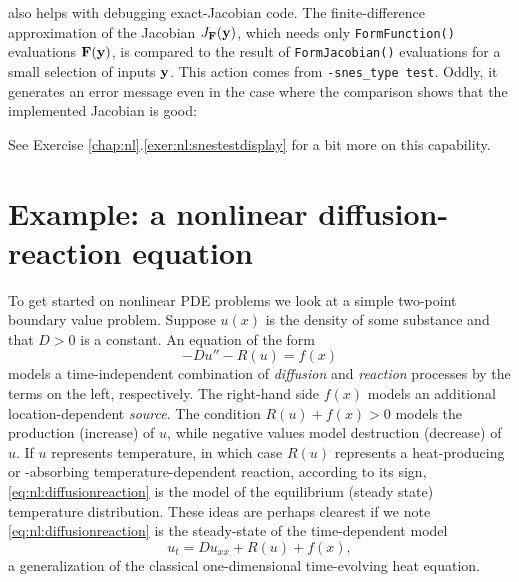 \PETSc also helps with debugging exact-Jacobian code.  The finite-difference approximation of the Jacobian $J_{\mathbf{F}}(\mathbf{y})$, which needs only \texttt{FormFunction()} evaluations $\mathbf{F}(\mathbf{y})$, is compared to the result of \texttt{FormJacobian()} evaluations for a small selection of inputs $\mathbf{y}$.  This action comes from \texttt{-snes\_type test}.   Oddly, it generates an error message even in the case where the comparison shows that the implemented Jacobian is good:
See Exercise \ref{chap:nl}.\ref{exer:nl:snestestdisplay} for a bit more on this capability.


\section{Example: a nonlinear diffusion-reaction equation}

To get started on nonlinear PDE problems we look at a simple two-point boundary value problem.  Suppose $u(x)$ is the density of some substance and that $D>0$ is a constant.  An equation of the form
\begin{equation}
- D u'' - R(u) = f(x)  \label{eq:nl:diffusionreaction}
\end{equation}
models a time-independent combination of \emph{diffusion} and \emph{reaction} processes by the terms on the left, respectively.  The right-hand side $f(x)$ models an additional location-dependent \emph{source}.  The condition $R(u)+f(x)>0$ models the production (increase) of $u$, while negative values model destruction (decrease) of $u$.  If $u$ represents temperature, in which case $R(u)$ represents a heat-producing or -absorbing temperature-dependent reaction, according to its sign, \eqref{eq:nl:diffusionreaction} is the model of the equilibrium (steady state) temperature distribution.  These ideas are perhaps clearest if we note \eqref{eq:nl:diffusionreaction} is the steady-state of the time-dependent model
\begin{equation}
u_t = D u_{xx} + R(u) + f(x),  \label{eq:nl:drtimedependent}
\end{equation}
a generalization of the classical one-dimensional time-evolving heat equation.

